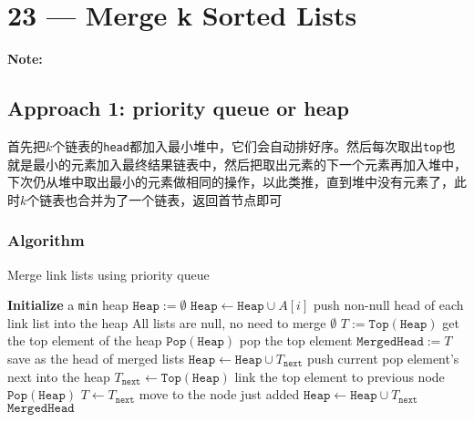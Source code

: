 \documentclass[a4paper,12pt]{article}
\begin{document}
\section{23 --- Merge k Sorted Lists}
\textbf{\large{Note:}}
\subsection{Approach 1: priority queue or heap}
\begin{CJK*}{UTF8}{gbsn}
首先把$k$个链表的\texttt{head}都加入最小堆中，它们会自动排好序。然后每次取出\texttt{top}也就是最小的元素加入最终结果链表中，然后把取出元素的下一个元素再加入堆中，下次仍从堆中取出最小的元素做相同的操作，以此类推，直到堆中没有元素了，此时$k$个链表也合并为了一个链表，返回首节点即可
\clearpage
\end{CJK*}
\subsubsection{Algorithm}
\setcounter{algorithm}{0}
\begin{algorithm}[H]
\caption{Merge link lists using priority queue}
\begin{algorithmic}[1]
\Statex
{}
\State \textbf{Initialize} a \texttt{min} heap $\mathtt{Heap} := \emptyset$
\State $\mathtt{Heap} \gets \mathtt{Heap} \cup A[i]$ \Comment push non-null head of each link list into the heap
\EndIf
\EndFor
{} \Comment All lists are null, no need to merge
\State \Return $\emptyset$
\EndIf
\State $T := \mathtt{Top}(\mathtt{Heap})$ \Comment get the top element of the heap 
\State $\mathtt{Pop}(\mathtt{Heap})$ \Comment pop the top element
\State $\mathtt{MergedHead} := T$ \Comment save as the head of merged lists
\State $\mathtt{Heap}\gets \mathtt{Heap} \cup T_{\mathtt{next}}$ \Comment push current pop element's next into the heap
\EndIf
{}
\State $T_{\mathtt{next}} \gets \mathtt{Top}(\mathtt{Heap})$ \Comment link the top element to previous node
\State $\mathtt{Pop}(\mathtt{Heap})$
\State $T \gets T_{\mathtt{next}} $ \Comment move to the node just added
\State $\mathtt{Heap}\gets \mathtt{Heap} \cup T_{\mathtt{next}}$
\EndIf
\EndWhile
\State \Return $\mathtt{MergedHead}$
\EndProcedure
\Statex
\end{algorithmic}
\end{algorithm}
\end{document}
